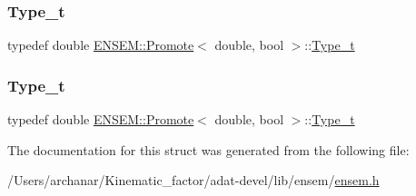 \mbox{\label{structENSEM_1_1Promote_3_01double_00_01bool_01_4_a14edc84a3688511a1539a90f9f319384}} 
\subsubsection{\texorpdfstring{Type\_t}{Type\_t}\hspace{0.1cm}{\footnotesize\ttfamily [2/3]}}
{\footnotesize\ttfamily typedef double \mbox{\hyperlink{structENSEM_1_1Promote}{E\+N\+S\+E\+M\+::\+Promote}}$<$ double, bool $>$\+::\mbox{\hyperlink{structENSEM_1_1Promote_3_01double_00_01bool_01_4_a14edc84a3688511a1539a90f9f319384}{Type\+\_\+t}}}

\mbox{\label{structENSEM_1_1Promote_3_01double_00_01bool_01_4_a14edc84a3688511a1539a90f9f319384}} 
\subsubsection{\texorpdfstring{Type\_t}{Type\_t}\hspace{0.1cm}{\footnotesize\ttfamily [3/3]}}
{\footnotesize\ttfamily typedef double \mbox{\hyperlink{structENSEM_1_1Promote}{E\+N\+S\+E\+M\+::\+Promote}}$<$ double, bool $>$\+::\mbox{\hyperlink{structENSEM_1_1Promote_3_01double_00_01bool_01_4_a14edc84a3688511a1539a90f9f319384}{Type\+\_\+t}}}



The documentation for this struct was generated from the following file\+:\begin{DoxyCompactItemize}
\item 
/\+Users/archanar/\+Kinematic\+\_\+factor/adat-\/devel/lib/ensem/\mbox{\hyperlink{adat-devel_2lib_2ensem_2ensem_8h}{ensem.\+h}}\end{DoxyCompactItemize}
